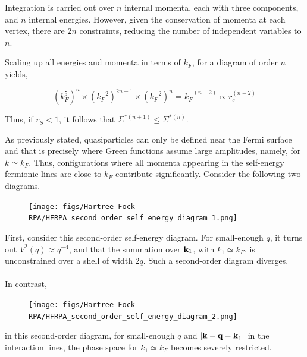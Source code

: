 \documentclass{homework}
\begin{document}
Integration is carried out over $n$ internal momenta, each with three components, and $n$ internal energies. However, given the conservation of momenta at each vertex, there are $2n$ constraints, reducing the number of independent variables to $n$. 

Scaling up all energies and momenta in terms of $k_F$, for a diagram of order $n$ yields,

\begin{equation}
    (k_F^5)^n \times (k_F^{-2})^{2n-1} \times (k_F^{-2})^{n} = k_F^{-(n-2)} \propto r_s^{(n-2)}
\end{equation}

Thus, if $r_S < 1$, it follows that $\Sigma^{*(n+1)} \leq \Sigma^{*(n)}$.

As previously stated, quasiparticles can only be defined near the Fermi surface and that is precisely where Green functions assume large amplitudes, namely, for $k \simeq k_F$. Thus, configurations where all momenta appearing in the self-energy fermionic lines are close to $k_F$ contribute significantly. Consider the following two diagrams. \\
  
\begin{figure}
\texttt{[image: figs/Hartree-Fock-RPA/HFRPA\_second\_order\_self\_energy\_diagram\_1.png]}
\end{figure} 

First, consider this second-order self-energy diagram. For small-enough $q$, it turns out $V^2(q) \approx {q^{-4}}$, and that the summation over ${\bf k}_1$, with $k_1 \simeq k_F$, is unconstrained over a shell of width $2q$. Such a second-order diagram diverges. \\

\blanky \\

In contrast,

\begin{figure}
\texttt{[image: figs/Hartree-Fock-RPA/HFRPA\_second\_order\_self\_energy\_diagram\_2.png]}
\end{figure} 

in this second-order diagram, for small-enough $q$ and $|{\bf k - q - k}_1|$ in the interaction lines, the phase space for $k_1 \simeq k_F$ becomes severely restricted. \\

\blanky \\
\end{document}
